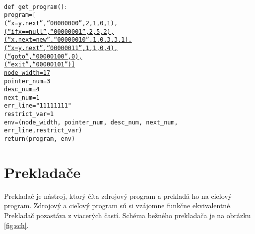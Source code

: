 \texttt{
\\
def get\_program()$\colon$\\
\tab program=[\\
\tab \tab (``x=y.next'',``00000000'',2,1,0,1),\\
\underline{\tab \tab (``ifx==null'',``00000001'',2,5,2),}\\
\underline{\tab \tab (``x.next=new'',``00000010'',1,0,3,3,1),}\\
\underline{\tab \tab (``x=y.next'',``00000011'',1,1,0,4),}\\
\underline{\tab \tab (``goto'',``00000100'',0),}\\
\underline{\tab \tab (``exit'',``00000101'')]}\\
\underline{\tab node\_width=17}\\
\tab pointer\_num=3\\
\underline{\tab desc\_num=4}\\
\tab next\_num=1\\
\tab err\_line="11111111"\\
\tab restrict\_var=1\\
\tab env=(node\_width, pointer\_num, desc\_num, next\_num, err\_line,restrict\_var)\\
\tab return(program, env)
}

\chapter{Prekladače}
Prekladač je nástroj, ktorý číta zdrojový program a prekladá ho na cieľový program.
Zdrojový a cieľový program sú si vzájomne funkčne ekvivalentné\cite{meduna}.
Prekladač pozastáva z viacerých častí. Schéma bežného prekladača je na obrázku \ref{fig:sch}.

